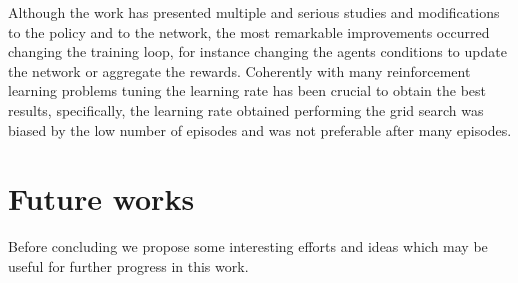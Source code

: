 \documentclass[11pt, a4paper, hidelinks]{report}
\begin{document}
Although the work has presented multiple and serious studies and modifications to the policy and to the network, the most remarkable improvements occurred changing the training loop, for instance changing the agents conditions to update the network or aggregate the rewards.
Coherently with many reinforcement learning problems tuning the learning rate has been crucial to obtain the best results, specifically, the learning rate obtained performing the grid search was biased by the low number of episodes and was not preferable after many episodes.

\newpage
\section{Future works}\label{sec:future-works}

Before concluding we propose some interesting efforts and ideas which may be useful for further progress in this work.
\end{document}
